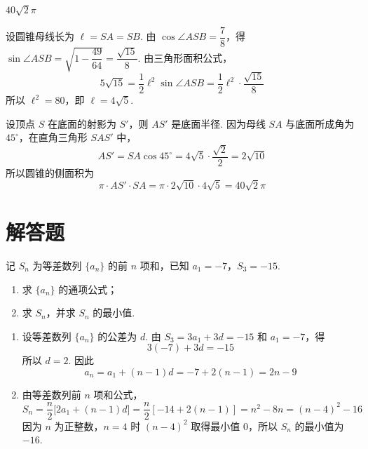 \begin{answer}
\(40\sqrt2\pi\)
\end{answer}

\begin{solution}
设圆锥母线长为 \(\ell=SA=SB\). 由
\(\cos\angle ASB=\dfrac78\)，得
\(\sin\angle ASB=\sqrt{1-\dfrac{49}{64}}=\dfrac{\sqrt{15}}8\). 由三角形面积公式，
\[
5\sqrt{15}=\frac12\ell^2\sin\angle ASB=\frac12\ell^2\cdot\frac{\sqrt{15}}8
\]
所以 \(\ell^2=80\)，即 \(\ell=4\sqrt5\).

设顶点 \(S\) 在底面的射影为 \(S'\)，则 \(AS'\) 是底面半径. 因为母线 \(SA\) 与底面所成角为 \(45^\circ\)，在直角三角形 \(SAS'\) 中，
\[
AS'=SA\cos45^\circ=4\sqrt5\cdot\frac{\sqrt2}{2}=2\sqrt{10}
\]
所以圆锥的侧面积为
\[
\pi\cdot AS'\cdot SA=\pi\cdot2\sqrt{10}\cdot4\sqrt5=40\sqrt2\pi
\]
\end{solution}

\section{解答题}

\begin{problem}
记 \(S_n\) 为等差数列 \(\{a_n\}\) 的前 \(n\) 项和，已知 \(a_1=-7\)，\(S_3=-15\).

\begin{enumerate}
\item 求 \(\{a_n\}\) 的通项公式；
\item 求 \(S_n\)，并求 \(S_n\) 的最小值.
\end{enumerate}
\end{problem}

\begin{solution}
\begin{enumerate}
\item 设等差数列 \(\{a_n\}\) 的公差为 \(d\). 由
\(S_3=3a_1+3d=-15\) 和 \(a_1=-7\)，得
\[
3(-7)+3d=-15
\]
所以 \(d=2\). 因此
\[
a_n=a_1+(n-1)d=-7+2(n-1)=2n-9
\]
\item 由等差数列前 \(n\) 项和公式，
\[
S_n=\frac n2\bigl[2a_1+(n-1)d\bigr]
=\frac n2[-14+2(n-1)]
=n^2-8n=(n-4)^2-16
\]
因为 \(n\) 为正整数，\(n=4\) 时 \((n-4)^2\) 取得最小值 \(0\)，所以 \(S_n\) 的最小值为 \(-16\).
\end{enumerate}
\end{solution}

